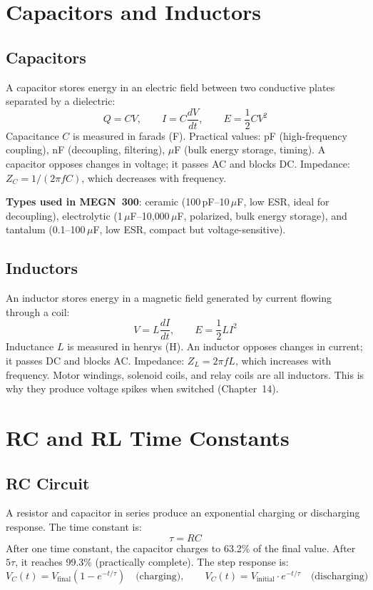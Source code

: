 \documentclass[11pt,letterpaper,twoside,openany]{book}
\begin{document}
\section{Capacitors and Inductors}

\subsection{Capacitors}
A capacitor stores energy in an electric field between two conductive plates separated by a dielectric:
\begin{equation}
Q = CV, \qquad I = C\frac{dV}{dt}, \qquad E = \frac{1}{2}CV^2
\end{equation}
Capacitance $C$ is measured in farads (F). Practical values: pF (high-frequency coupling), nF (decoupling, filtering), $\mu$F (bulk energy storage, timing). A capacitor opposes changes in voltage; it passes AC and blocks DC. Impedance: $Z_C = 1/(2\pi f C)$, which decreases with frequency.

\textbf{Types used in MEGN~300}: ceramic (100\,pF--10\,$\mu$F, low ESR, ideal for decoupling), electrolytic (1\,$\mu$F--10{,}000\,$\mu$F, polarized, bulk energy storage), and tantalum (0.1--100\,$\mu$F, low ESR, compact but voltage-sensitive).

\subsection{Inductors}
An inductor stores energy in a magnetic field generated by current flowing through a coil:
\begin{equation}
V = L\frac{dI}{dt}, \qquad E = \frac{1}{2}LI^2
\end{equation}
Inductance $L$ is measured in henrys (H). An inductor opposes changes in current; it passes DC and blocks AC. Impedance: $Z_L = 2\pi f L$, which increases with frequency. Motor windings, solenoid coils, and relay coils are all inductors. This is why they produce voltage spikes when switched (Chapter~14).

\section{RC and RL Time Constants}

\subsection{RC Circuit}
A resistor and capacitor in series produce an exponential charging or discharging response. The time constant is:
\begin{equation}
\tau = RC
\end{equation}
After one time constant, the capacitor charges to 63.2\% of the final value. After $5\tau$, it reaches 99.3\% (practically complete). The step response is:
\begin{equation}
V_C(t) = V_{\text{final}} \left(1 - e^{-t/\tau}\right) \quad \text{(charging)}, \qquad V_C(t) = V_{\text{initial}} \cdot e^{-t/\tau} \quad \text{(discharging)}
\end{equation}
\end{document}
